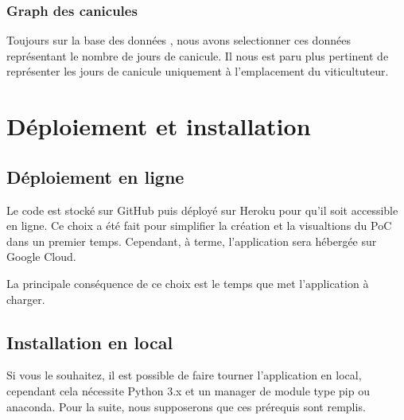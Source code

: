 \documentclass[letterpaper,10pt,french]{sphinxmanual}
\begin{document}
\subsubsection{Graph des canicules}
\label{\detokenize{indicateurs:graph-des-canicules}}
\sphinxAtStartPar
Toujours sur la base des données , nous avons selectionner ces données représentant le nombre de jours de canicule. Il nous est paru plus pertinent de représenter les jours de canicule uniquement à l’emplacement du viticultuteur.


\section{Déploiement et installation}
\label{\detokenize{use:deploiement-et-installation}}\label{\detokenize{use:instal}}\label{\detokenize{use::doc}}

\subsection{Déploiement en ligne}
\label{\detokenize{use:deploiement-en-ligne}}
\sphinxAtStartPar
Le code est stocké sur GitHub puis déployé sur Heroku pour qu’il soit accessible en ligne. Ce choix a été fait pour simplifier la création et la visualtions du PoC dans un premier temps. Cependant, à terme, l’application sera hébergée sur Google Cloud.

\sphinxAtStartPar
La principale conséquence de ce choix est le temps que met l’application à charger.


\subsection{Installation en local}
\label{\detokenize{use:installation-en-local}}
\sphinxAtStartPar
Si vous le souhaitez, il est possible de faire tourner l’application en local, cependant cela nécessite Python 3.x et un manager de module type pip ou anaconda.
Pour la suite, nous supposerons que ces pré\sphinxhyphen{}requis sont remplis.
\end{document}
